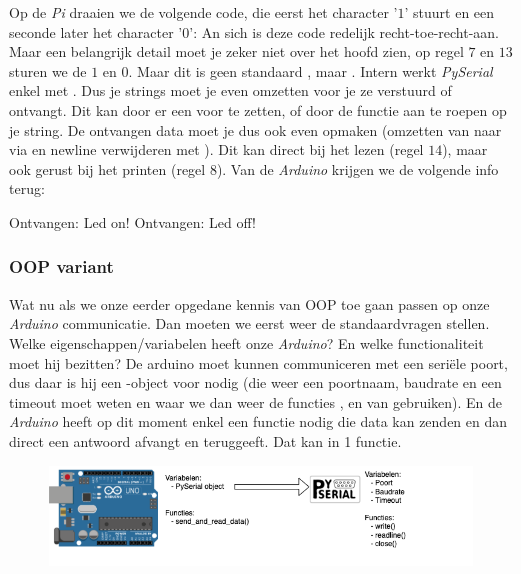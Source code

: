 Op de \textit{Pi} draaien we de volgende code, die eerst het character '$1$' stuurt en een seconde later het character '$0$':
An sich is deze code redelijk recht-toe-recht-aan. Maar een belangrijk detail moet je zeker niet over het hoofd zien, op regel $7$ en $13$ sturen we de $1$ en $0$. Maar dit is geen standaard , maar . Intern werkt \textit{PySerial} enkel met . Dus je strings moet je even omzetten voor je ze verstuurd of ontvangt. Dit kan door er een  voor te zetten, of door de functie  aan te roepen op je string.\newline
De ontvangen data moet je dus ook even opmaken (omzetten van  naar  via  en newline verwijderen met ). Dit kan direct bij het lezen (regel $14$), maar ook gerust bij het printen (regel $8$). Van de \textit{Arduino} krijgen we de volgende info terug:
\begin{python}
Ontvangen: Led on!
Ontvangen: Led off!
\end{python}

\newpage

\subsubsection{OOP variant}
Wat nu als we onze eerder opgedane kennis van OOP toe gaan passen op onze \textit{Arduino} communicatie. Dan moeten we eerst weer de standaardvragen stellen. Welke eigenschappen/variabelen heeft onze \textit{Arduino}? En welke functionaliteit moet hij bezitten? \newline
De arduino moet kunnen communiceren met een seriële poort, dus daar is hij een -object voor nodig (die weer een poortnaam, baudrate en een timeout moet weten en waar we dan weer de functies ,  en  van gebruiken). En de \textit{Arduino} heeft op dit moment enkel een functie nodig die data kan zenden en dan direct een antwoord afvangt en teruggeeft. Dat kan in 1 functie.
\begin{figure}[h!]
\centering\includegraphics[scale=0.7]{Pictures/chapter08/arduino_oop.png}
\label{fig:arduino_oop} %
\end{figure}

